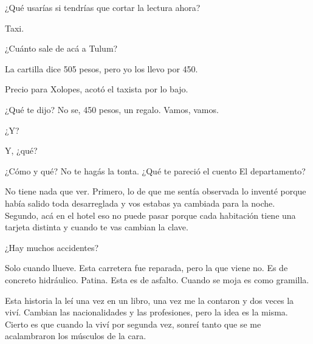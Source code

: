 \documentclass[11pt,twoside,openright,a6paper]{book}
\begin{document}
¿Qué usarías si tendrías que cortar la lectura ahora?


\vspace{0.5cm}
\hrulefill\hspace{0.2cm} \decofourleft\decofourright \hspace{0.2cm} \hrulefill
\vspace{0.5cm}

Taxi.

¿Cuánto sale de acá a Tulum?

La cartilla dice 505 pesos, pero yo los llevo por 450.

Precio para Xolopes, acotó el taxista por lo bajo.

¿Qué te dijo? No se, 450 pesos, un regalo. Vamos, vamos.


\vspace{0.5cm}
\hrulefill\hspace{0.2cm} \decofourleft\decofourright \hspace{0.2cm} \hrulefill
\vspace{0.5cm}

¿Y?

Y, ¿qué?

¿Cómo y qué? No te hagás la tonta. ¿Qué te pareció el cuento El
departamento?

No tiene nada que ver. Primero, lo de que me sentía observada lo inventé
porque había salido toda desarreglada y vos estabas ya cambiada para la
noche. Segundo, acá en el hotel eso no puede pasar porque cada habitación
tiene una tarjeta distinta y cuando te vas cambian la clave.


\vspace{0.5cm}
\hrulefill\hspace{0.2cm} \decofourleft\decofourright \hspace{0.2cm} \hrulefill
\vspace{0.5cm}

¿Hay muchos accidentes?

Solo cuando llueve. Esta carretera fue reparada, pero la que viene no. Es
de concreto hidráulico. Patina. Esta es de asfalto. Cuando se moja es
como gramilla.


\vspace{0.5cm}
\hrulefill\hspace{0.2cm} \decofourleft\decofourright \hspace{0.2cm} \hrulefill
\vspace{0.5cm}

Esta historia la leí una vez en un libro, una vez me la contaron y dos
veces la viví. Cambian las nacionalidades y las profesiones, pero la idea
es la misma. Cierto es que cuando la viví por segunda vez, sonreí tanto
que se me acalambraron los músculos de la cara.
\end{document}
